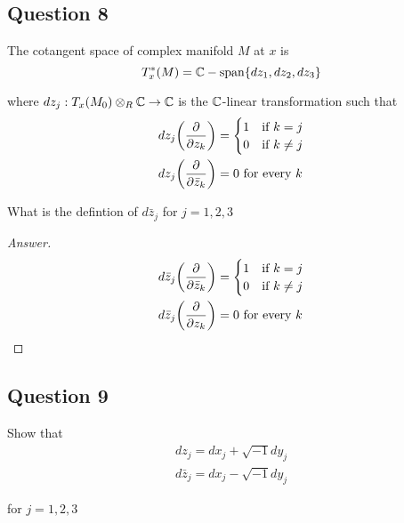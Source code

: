 \documentclass{article}
\begin{document}
\subsection{Question 8}

The cotangent space of complex manifold $M$ at $x$ is
$$
    T_x^*(M) = \mathbb{C}-\operatorname{span}\{dz_1, dz_2, dz_3\}
$$

where $dz_j: T_x(M_0) \otimes_R \mathbb{C} \to \mathbb{C}$ is the $\mathbb{C}$-linear transformation such that
\begin{align*}
    dz_j \tuple*{\frac{\partial}{\partial z_k}} &= \begin{cases}
        1 &\text{if $k=j$} \\
        0 &\text{if $k \neq j$}
    \end{cases} \\
    dz_j \tuple*{\frac{\partial}{\partial \bar{z}_k}} &= 0 \text{ for every $k$}
\end{align*}

What is the defintion of $d\bar{z}_j$ for $j=1,2,3$

\begin{proof}[Answer]

\begin{align*}
    d\bar{z}_j \tuple*{\frac{\partial}{\partial \bar{z}_k}} &= \begin{cases}
        1 &\text{if $k=j$} \\
        0 &\text{if $k \neq j$}
    \end{cases} \\
    d\bar{z}_j \tuple*{\frac{\partial}{\partial z_k}} &= 0 \text{ for every $k$}
\end{align*}
    
\end{proof}

\subsection{Question 9}
Show that
\begin{align*}
    dz_j = dx_j + \sqrt{-1} dy_j \\
    d\bar{z}_j = dx_j - \sqrt{-1} dy_j
\end{align*}

for $j=1,2,3$
\end{document}
